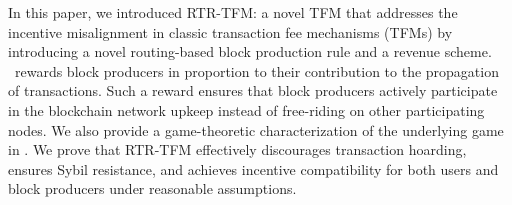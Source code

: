 
In this paper, we introduced \textsc{RTR-TFM}: a novel TFM that addresses the incentive misalignment in classic transaction fee mechanisms (TFMs) by introducing a novel routing-based block production rule and a revenue scheme. \ourTFM\ rewards block producers in proportion to their contribution to the propagation of transactions. Such a reward ensures that block producers actively participate in the blockchain network upkeep instead of free-riding on other participating nodes. We also provide a game-theoretic characterization of the underlying game in \ourTFM. We prove that \textsc{RTR-TFM} effectively discourages transaction hoarding, ensures Sybil resistance, and achieves incentive compatibility for both users and block producers under reasonable assumptions.



